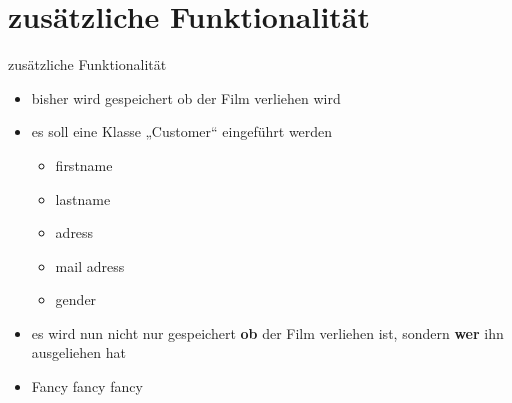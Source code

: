 \documentclass{beamer} %
\begin{document}
\section{zusätzliche Funktionalität}
\begin{frame}{zusätzliche Funktionalität}
	\begin{itemize}
		\item bisher wird gespeichert ob der Film verliehen wird\pause
		\item es soll eine Klasse „Customer“ eingeführt werden
			\begin{itemize}
				\item firstname
				\item lastname
				\item adress
				\item mail adress
				\item gender
			\end{itemize}\pause
		\item es wird nun nicht nur gespeichert \textbf{ob} der Film verliehen
			ist, sondern \textbf{wer} ihn ausgeliehen hat\pause
		\item Fancy fancy fancy
	\end{itemize}
\end{frame}

\section{}
\begin{frame}
\end{frame}
\end{document}
